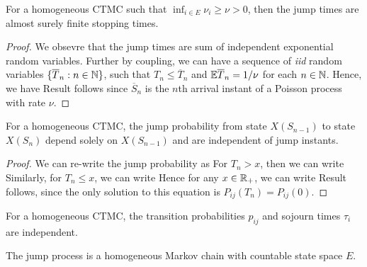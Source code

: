 \documentclass[a4paper,10pt,english]{article}
\begin{document}
\begin{prop} 
For a homogeneous CTMC such that $\inf_{i \in E} \nu_i \geq \nu > 0$, then the jump times are almost surely finite stopping times. 
\end{prop}
\begin{proof}
We obsevre that the jump times are sum of independent exponential random variables. %
Further by coupling, we can have a sequence of \textit{iid} random variables $\{\overline{T}_n: n \in \mathbb{N}\}$, 
such that $T_n \leq \overline{T}_n$ and $\mathbb{E} \overline{T}_n = 1/\nu$ for each $n \in \mathbb{N}$. 
Hence, we have 
Result follows since $\overline{S}_n$ is the $n$th arrival instant of a Poisson process with rate $\nu$. 
\end{proof}
\begin{lem}
\label{Lemma:JumpProb}
For a homogeneous CTMC, the jump probability from state $X(S_{n-1})$ to state $X(S_n)$ depend solely on $X(S_{n-1})$ and are independent of jump instants.  
\end{lem}
\begin{proof}
We can re-write the jump probability as
For $T_n > x$, then we can write
Similarly, for $T_n \leq x$, we can write 
Hence for any $x \in \mathbb{R}_+$, we can write
Result follows, since the only solution to this equation is $P_{ij}(T_n) = P_{ij}(0)$. 
\end{proof}
\begin{cor} 
For a homogeneous CTMC, the transition probabilities $p_{ij}$ and sojourn times $\tau_i$ are independent. 
\end{cor}
\begin{cor}
The jump process is a homogeneous Markov chain with countable state space $E$. 
\end{cor}
\end{document}
